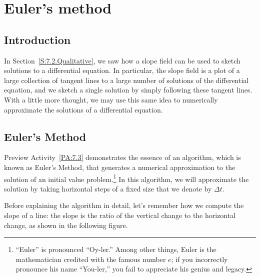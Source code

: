 \section{Euler's method} \label{S:7.3.Euler}

\vspace*{-14 pt}

\subsection*{Introduction}

In Section~\ref{S:7.2.Qualitative}, we saw how a slope field can be used to sketch
solutions to a differential equation.  In particular, the slope field
is a plot of a large collection of tangent lines to a large number of solutions of the
differential equation, and we sketch a single solution by simply following
these tangent lines.  With a little more thought, we may use this same
idea to numerically approximate the solutions of a differential equation.  



\subsection*{Euler's Method} 

Preview Activity~\ref{PA:7.3} demonstrates the essence of an algorithm, which is known as
Euler's Method, that generates a numerical approximation to the solution
of an initial value problem.\footnote{``Euler'' is pronounced
  ``Oy-ler.''  Among other things, Euler is the mathematician credited with the famous number $e$; if you incorrectly pronounce his name ``You-ler,'' you fail to appreciate his genius and legacy.}  In this algorithm, we
will approximate the solution by taking horizontal steps of a fixed
size that we denote by $\Delta t$.  

Before explaining the algorithm in detail, let's remember how we
compute the slope of a line:  the slope is the ratio of the vertical
change to the horizontal change, as shown in the following figure.

